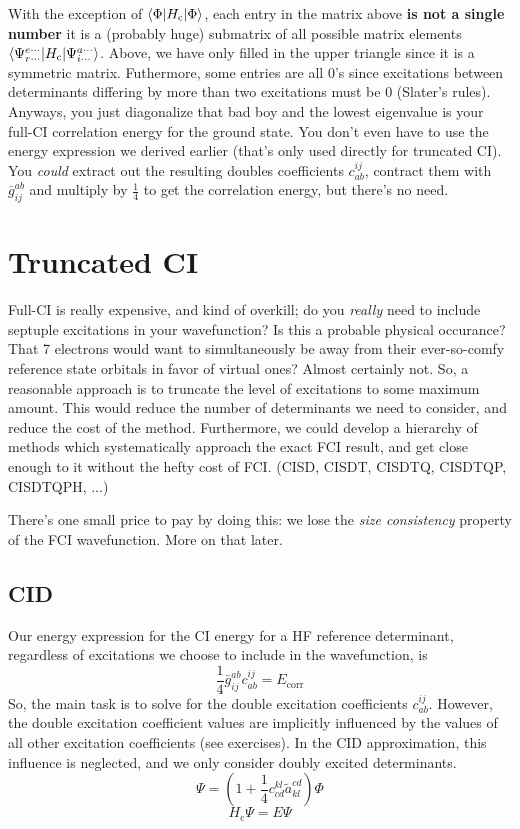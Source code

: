 \documentclass{article}
\newcommand{\Ecorr}{E_{\mathrm{corr}}}
\newcommand{\Hc}{H_{\mathrm{c}}}
\begin{document}
With the exception of $\braket{\Phi|\Hc|\Phi}$, each entry in the matrix above \textbf{is not a single number} it is a (probably huge) 
    submatrix of all possible matrix elements $\braket{\Psi_{r \cdots}^{e \cdots} | \Hc | \Psi_{i \cdots}^{a \cdots}  }$.
Above, we have only filled in the upper triangle since it is a symmetric matrix. 
Futhermore, some entries are all 0's since excitations between determinants differing by more than two excitations must be 0 (Slater's rules).
Anyways, you just diagonalize that bad boy and the lowest eigenvalue is your full-CI 
    correlation energy for the ground state. 
You don't even have to use the energy expression we derived earlier (that's only used directly for truncated CI).
You \textit{could} extract out the resulting doubles coefficients $c_{ab}^{ij}$, 
contract them with $\bar{g}_{ij}^{ab}$ and multiply by $\frac{1}{4}$ to get the correlation energy,
but there's no need.

\section{Truncated CI}
Full-CI is really expensive, and kind of overkill; do you \textit{really} need to include
septuple excitations in your wavefunction? Is this a probable physical occurance?
That 7 electrons would want to simultaneously be away from their ever-so-comfy reference state orbitals
in favor of virtual ones? Almost certainly not.
So, a reasonable approach is to truncate the level of excitations to some maximum amount.
This would reduce the number of determinants we need to consider, and reduce the cost of the method.
Furthermore, we could develop a hierarchy of methods which systematically approach the exact FCI result, 
and get close enough to it without the hefty cost of FCI. (CISD, CISDT, CISDTQ, CISDTQP, CISDTQPH, ...)

There's one small price to pay by doing this: we lose the \textit{size consistency} property of the FCI wavefunction.
More on that later.

\subsection{CID}
Our energy expression for the CI energy for a HF reference determinant, 
    regardless of excitations we choose to include in the wavefunction, is
\[ \frac{1}{4} \bar{g}_{ij}^{ab} c_{ab}^{ij} = \Ecorr \]
So, the main task is to solve for the double excitation coefficients $c_{ab}^{ij}$.
However, the double excitation coefficient values are implicitly influenced by the values of all other  
    excitation coefficients (see exercises).
In the CID approximation, this influence is neglected, and we only consider doubly excited determinants.
\[\Psi = (1 + \frac{1}{4} c_{cd}^{kl} \tilde{a}_{kl}^{cd}) \Phi \]
\[\Hc \Psi = E \Psi\]
\end{document}
